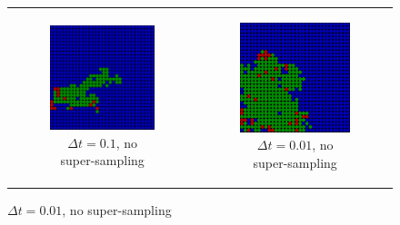 \begin{figure}
\begin{center}
	\begin{tabular}{c c}
		\begin{subfigure}[b]{0.4\textwidth}
			\centering
			\includegraphics[width=.7\textwidth, angle=0]{./../shared/fig/randomness/SIR_32x32_200time_01delta_noSS.png}
			\caption{$\Delta t = 0.1$, no super-sampling}
			\label{fig:sir_abs_timeDeltas_randomness_dt01}
		\end{subfigure}
	
		& 
		
		\begin{subfigure}[b]{0.4\textwidth}
			\centering
			\includegraphics[width=.7\textwidth, angle=0]{./../shared/fig/randomness/SIR_32x32_200time_001delta_noSS.png}
			\caption{$\Delta t = 0.01$, no super-sampling}
			\label{fig:sir_abs_timeDeltas_randomness_dt001}
		\end{subfigure}
		

\end{tabular}
\end{center}
\end{figure}
